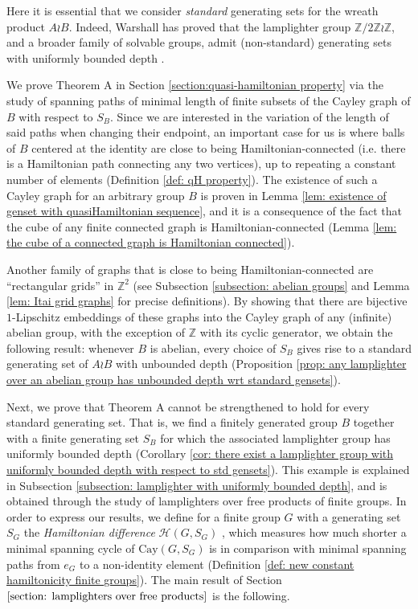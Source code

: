 \documentclass[reqno,oneside]{amsart}
\newcommand{\cay}[2]{\mathrm{Cay}(#1,#2)}
\newcommand{\Z}{\mathbb{Z}}
\theoremstyle{plain}
\theoremstyle{definition}
\begin{document}
Here it is essential that we consider \textit{standard} generating sets for the wreath product $A\wr B$. Indeed, Warshall has proved that the lamplighter group $\Z/2\Z \wr \Z$, and a broader family of solvable groups, admit (non-standard) generating sets with uniformly bounded depth \cite{warshall2008strongly}.


We prove Theorem A in Section \ref{section:quasi-hamiltonian property} via the study of spanning paths of minimal length of finite subsets of the Cayley graph of $B$ with respect to $S_B$. Since we are interested in the variation of the length of said paths when changing their endpoint, an important case for us is where balls of $B$ centered at the identity are close to being Hamiltonian-connected (i.e. there is a Hamiltonian path connecting any two vertices), up to repeating a constant number of elements (Definition \ref{def: qH property}). The existence of such a Cayley graph for an arbitrary group $B$ is proven in Lemma \ref{lem: existence of genset with quasiHamiltonian sequence}, and it is a consequence of the fact that the cube of any finite connected graph is Hamiltonian-connected (Lemma \ref{lem: the cube of a connected graph is Hamiltonian connected}).

Another family of graphs that is close to being Hamiltonian-connected are ``rectangular grids'' in $\Z^2$ (see Subsection \ref{subsection: abelian groups} and Lemma \ref{lem: Itai grid graphs} for precise definitions). By showing that there are bijective $1$-Lipschitz embeddings of these graphs into the Cayley graph of any (infinite) abelian group, with the exception of $\Z$ with its cyclic generator, we obtain the following result: whenever $B$ is abelian, every choice of $S_B$ gives rise to a standard generating set of $A\wr B$ with unbounded depth (Proposition \ref{prop: any lamplighter over an abelian group has unbounded depth wrt standard gensets}).

Next, we prove that Theorem A cannot be strengthened to hold for every standard generating set. That is, we find a finitely generated group $B$ together with a finite generating set $S_B$ for which the associated lamplighter group has uniformly bounded depth (Corollary \ref{cor: there exist a lamplighter group with uniformly bounded depth with respect to std gensets}). This example is explained in Subsection \ref{subsection: lamplighter with uniformly bounded depth}, and is obtained through the study of lamplighters over free products of finite groups. In order to express our results, we define for a finite group $G$ with a generating set $S_G$ the \textit{Hamiltonian difference} $\mathscr{H}(G,S_G)$ , which measures how much shorter a minimal spanning cycle of $\cay{G}{S_G}$ is in comparison with minimal spanning paths from $e_G$ to a non-identity element (Definition \ref{def: new constant hamiltonicity finite groups}). The main result of Section $\ref{section: lamplighters over free products}$ is the following.
\end{document}
